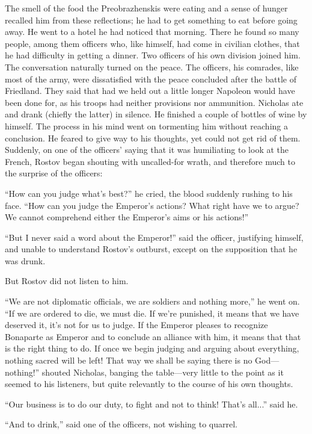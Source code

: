 The smell of the food the Preobrazhenskis were eating and a sense
of hunger recalled him from these reflections; he had to get
something to eat before going away. He went to a hotel he had
noticed that morning.  There he found so many people, among them
officers who, like himself, had come in civilian clothes, that he
had difficulty in getting a dinner. Two officers of his own
division joined him. The conversation naturally turned on the
peace. The officers, his comrades, like most of the army, were
dissatisfied with the peace concluded after the battle of
Friedland. They said that had we held out a little longer
Napoleon would have been done for, as his troops had neither
provisions nor ammunition.  Nicholas ate and drank (chiefly the
latter) in silence. He finished a couple of bottles of wine by
himself. The process in his mind went on tormenting him without
reaching a conclusion. He feared to give way to his thoughts, yet
could not get rid of them. Suddenly, on one of the officers'
saying that it was humiliating to look at the French, Rostov
began shouting with uncalled-for wrath, and therefore much to the
surprise of the officers:

``How can you judge what's best?'' he cried, the blood suddenly
rushing to his face. ``How can you judge the Emperor's actions?
What right have we to argue? We cannot comprehend either the
Emperor's aims or his actions!''

``But I never said a word about the Emperor!'' said the officer,
justifying himself, and unable to understand Rostov's outburst,
except on the supposition that he was drunk.

But Rostov did not listen to him.

``We are not diplomatic officials, we are soldiers and nothing
more,'' he went on. ``If we are ordered to die, we must die. If
we're punished, it means that we have deserved it, it's not for
us to judge. If the Emperor pleases to recognize Bonaparte as
Emperor and to conclude an alliance with him, it means that that
is the right thing to do. If once we begin judging and arguing
about everything, nothing sacred will be left! That way we shall
be saying there is no God---nothing!'' shouted Nicholas, banging
the table---very little to the point as it seemed to his
listeners, but quite relevantly to the course of his own
thoughts.

``Our business is to do our duty, to fight and not to think!
That's all...'' said he.

``And to drink,'' said one of the officers, not wishing to
quarrel.

